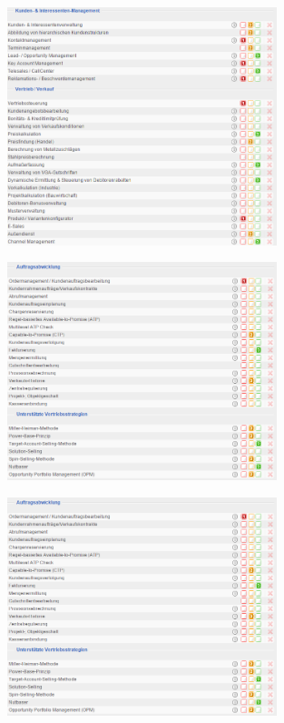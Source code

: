\documentclass[12pt]{article}
\begin{document}
\noindent
\begin{figure}[here!]
\centering
\includegraphics[width=0.7\textwidth]{images/tr11}
\end{figure}\FloatBarrier
\noindent
\begin{figure}[here!]
\centering
\includegraphics[width=0.7\textwidth]{images/tr12}
\end{figure}\FloatBarrier
\noindent
\begin{figure}[here!]
\centering
\includegraphics[width=0.7\textwidth]{images/tr13}
\end{figure}\FloatBarrier
\end{document}
